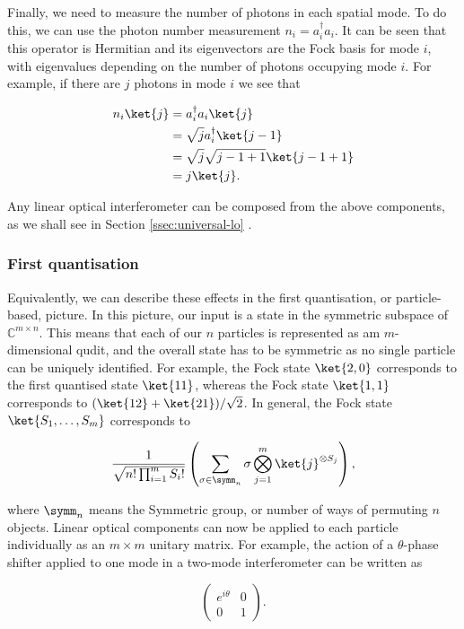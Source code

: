Finally, we need to measure the number of photons in each spatial mode. To do this, we can use the photon number measurement $n_i = a_i^\dagger a_i$. It can be seen that this operator is Hermitian and its eigenvectors are the Fock basis for mode $i$, with eigenvalues depending on the number of photons occupying mode $i$. For example, if there are $j$ photons in mode $i$ we see that

\begin{align}
n_i\ket{j} &= a_i^\dagger a_i\ket{j}\\
&= \sqrt{j}a_i^\dagger\ket{j-1}\\
&= \sqrt{j}\sqrt{j-1+1}\ket{j-1+1}\\
&= j\ket{j}.
\end{align}

Any linear optical interferometer can be composed from the above components, as we shall see in Section \ref{ssec:universal-lo} \cite{hurwitz1897, reck1994, clements2016}.

\subsubsection{First quantisation}

Equivalently, we can describe these effects in the first quantisation, or particle-based, picture. In this picture, our input is a state in the symmetric subspace of $\mathbb{C}^{m\times n}$. This means that each of our $n$ particles is represented as am $m$-dimensional qudit, and the overall state has to be symmetric as no single particle can be uniquely identified. For example, the Fock state $\ket{2,0}$ corresponds to the first quantised state $\ket{11}$, whereas the Fock state $\ket{1,1}$ corresponds to $(\ket{12} + \ket{21})/\sqrt{2}$. In general, the Fock state $\ket{S_1,\dots,S_m}$ corresponds to

\begin{equation}
\frac{1}{\sqrt{n!\prod_{i=1}^mS_i!}}\left(\sum_{\sigma\in\symm_n}\sigma\bigotimes_{j=1}^m\ket{j}^{\otimes S_j}\right),
\end{equation}

\noindent where $\symm_n$ means the Symmetric group, or number of ways of permuting $n$ objects. Linear optical components can now be applied to each particle individually as an $m \times m$ unitary matrix. For example, the action of a $\theta$-phase shifter applied to one mode in a two-mode interferometer can be written as

\begin{equation}
\begin{pmatrix}
e^{i\theta} & 0\\
0 & 1
\end{pmatrix}.
\end{equation}

